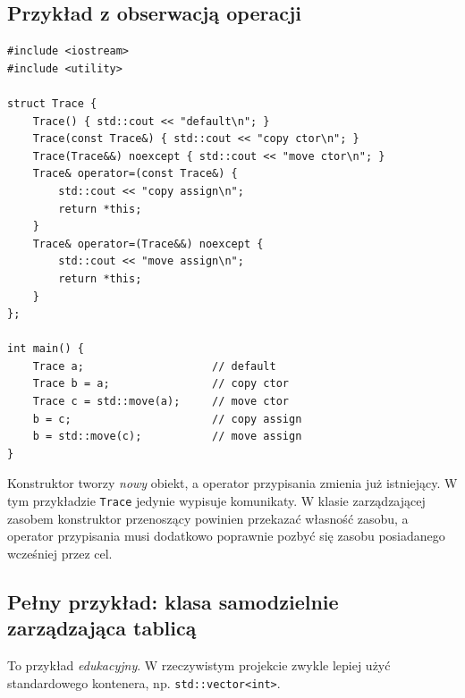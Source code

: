 \subsection{Przykład z obserwacją operacji}
\label{sec:move-trace}

\begin{lstlisting}
#include <iostream>
#include <utility>

struct Trace {
    Trace() { std::cout << "default\n"; }
    Trace(const Trace&) { std::cout << "copy ctor\n"; }
    Trace(Trace&&) noexcept { std::cout << "move ctor\n"; }
    Trace& operator=(const Trace&) {
        std::cout << "copy assign\n";
        return *this;
    }
    Trace& operator=(Trace&&) noexcept {
        std::cout << "move assign\n";
        return *this;
    }
};

int main() {
    Trace a;                    // default
    Trace b = a;                // copy ctor
    Trace c = std::move(a);     // move ctor
    b = c;                      // copy assign
    b = std::move(c);           // move assign
}
\end{lstlisting}

Konstruktor tworzy \emph{nowy} obiekt, a operator przypisania
zmienia już istniejący. W tym przykładzie \texttt{Trace} jedynie
wypisuje komunikaty. W klasie zarządzającej zasobem konstruktor
przenoszący powinien przekazać własność zasobu, a operator
przypisania musi dodatkowo poprawnie pozbyć się zasobu
posiadanego wcześniej przez cel.

\subsection{Pełny przykład: klasa samodzielnie zarządzająca tablicą}
\label{sec:move-raw-buffer}

To przykład \emph{edukacyjny}. W rzeczywistym projekcie zwykle
lepiej użyć standardowego kontenera, np. \texttt{std::vector<int>}.

